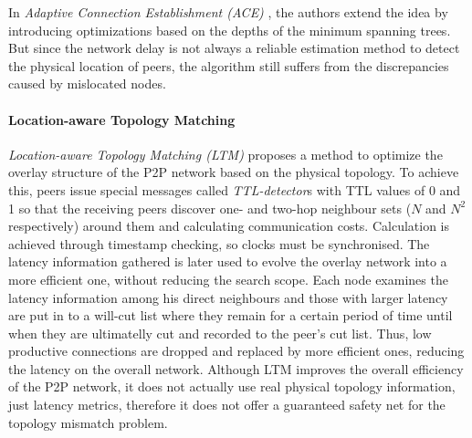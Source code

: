 %
%
 In
\emph{Adaptive Connection Establishment (ACE)} \cite{liu_ace_2004}, the authors
extend the idea by introducing optimizations based on the depths of the minimum
spanning trees. But since the network delay is not always a reliable estimation
method to detect the physical location of peers, the algorithm still suffers
from the discrepancies caused by mislocated nodes.

\paragraph*{\bf Location-aware Topology Matching}
\emph{Location-aware Topology Matching (LTM)} \cite{liu_ltm_2004} proposes a
method to optimize the overlay structure of the P2P network based on the
physical topology. To achieve this, peers issue special messages called
\textit{TTL-detector}s with TTL values of 0 and 1 so that the receiving peers
discover one- and two-hop neighbour sets ($N$ and $N^2$ respectively) around
them and calculating communication costs. Calculation is achieved through
timestamp checking, so clocks must be synchronised. The latency information
gathered is later used to evolve the overlay network into a more efficient one,
without reducing the search scope. Each node examines the latency information
among his direct neighbours and those with larger latency are put in to a
will-cut list where they remain for a certain period of time until when they are
ultimatelly cut and recorded to the peer's cut list. Thus, low productive
connections are dropped and replaced by more efficient ones, reducing the
latency on the overall network. Although LTM improves the overall efficiency of
the P2P network, it does not actually use real physical topology information,
just latency metrics, therefore it does not offer a guaranteed safety net for
the topology mismatch problem.

